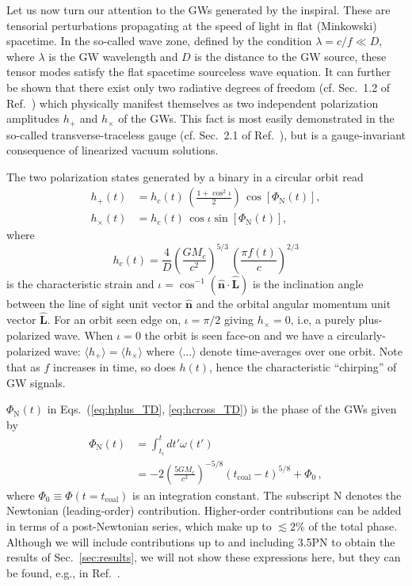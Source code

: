 \documentclass[prd,amsmath,amssymb,aps,floats,amsfonts,notitlepage,superscriptaddress,eqsecnum,nofootinbib,10pt]{revtex4-1}
\newcommand{\nn}{\nonumber}
\newcommand{\f}{\frac}
\newcommand{\be}{\begin{equation}}
\newcommand{\ee}{\end{equation}}
\begin{document}
Let us now turn our attention to the GWs generated by the inspiral.
These are tensorial perturbations propagating at the speed of light in flat (Minkowski) spacetime.
In the so-called wave zone, defined by the condition $ \lambda= c/f \ll D$, where $\lambda$ is the GW wavelength and $D$ is the distance to the GW source, 
these tensor modes satisfy the flat spacetime sourceless wave equation. %
%
It can further be shown that there exist only two radiative degrees of freedom (cf. Sec.~1.2 of Ref.~\cite{Maggiore}) which physically manifest themselves as two independent polarization amplitudes $h_+$ and $h_\times$ of the GWs. 
This fact is most easily demonstrated in the so-called transverse-traceless gauge (cf. Sec.~2.1 of Ref.~\cite{Flanagan:2005yc}),
 but is a gauge-invariant consequence of linearized vacuum solutions. %

The two polarization states generated by a binary in a circular orbit read \cite{Maggiore}
%
\begin{align}
 h_+(t) &= h_c(t)\, \left(\f{1+\cos^2\iota}{2}\right)\, \cos[\Phi_\text{N}(t)],\label{eq:hplus_TD}\\
 h_\times(t) & =h_c(t)\,\cos\iota \sin[\Phi_\text{N}(t)]\label{eq:hcross_TD},
\end{align}
%
%
where
%
\be
h_c(t) =\f{4}{D}\left(\f{G M_c}{c^2}\right)^{5/3}\, \left(\f{\pi f(t)}{c}\right)^{2/3} \label{eq:h_c}
\ee
is the characteristic strain and
$\iota=\cos^{-1}(\mathbf{\hat{n}}\cdot{\mathbf{\hat{L}}}) $ is the inclination angle between the line of sight unit vector $\mathbf{\hat{n}} $ and the orbital angular momentum unit vector $\mathbf{\hat{L}}$. 
For an orbit seen edge on, $\iota = \pi/2$ giving $h_\times=0$, i.e,  a purely plus-polarized wave.
When $\iota=0$ the orbit is seen face-on and we have a circularly-polarized wave: $\langle h_+ \rangle = \langle h_\times\rangle$ where $\langle \ldots \rangle$
denote time-averages over one orbit. Note that as $f$ increases in time, so does $h(t)$, hence the characteristic ``chirping'' of GW signals.

$\Phi_\text{N}(t)$ in Eqs.~(\ref{eq:hplus_TD}, \ref{eq:hcross_TD}) is the phase of the GWs given by
%
\begin{align}
\Phi_\text{N}(t) &=\int_{t_i}^t dt' \omega(t') \nn\\
&= -2\left(\f{5 G M_c}{c^3}\right)^{-5/8} (t_\text{coal}-t)^{5/8}+ \Phi_0 \, ,\label{eq:Phase}
\end{align}
%
where $\Phi_0 \equiv \Phi(t=t_\text{coal})$ is an integration constant. The subscript N denotes the Newtonian (leading-order) contribution. 
Higher-order contributions can be added in terms of a post-Newtonian series, which make up to $\lesssim 2\%$ of the total phase.
Although we will include contributions up to and including 3.5PN to obtain the results of Sec.~\ref{sec:results}, 
we will not show these expressions here, but they can be found, e.g., in Ref.~\cite{Blanchet_LRR}.
\end{document}
